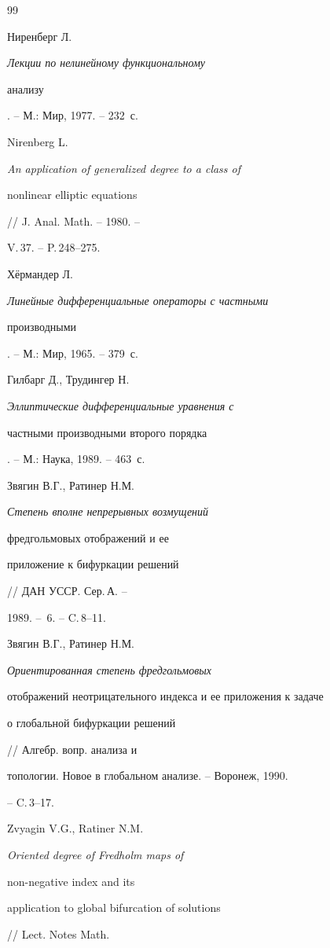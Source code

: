 \begin{thebibliography}{99}







Ниренберг Л. {\em Лекции по нелинейному функциональному 


анализу}. -- М.: Мир, 1977. -- 232~с.




Nirenberg L. {\em An application of generalized degree to a class of


nonlinear elliptic equations} // J. Anal. Math. -- 1980. --


V.\,37. -- P.\,248--275.




Х\"ермандер Л. {\em Линейные дифференциальные операторы с частными


производными}. -- М.: Мир, 1965. -- 379~с.




Гилбарг Д., Трудингер Н. {\em Эллиптические дифференциальные уравнения с


частными производными второго порядка}. -- М.: Наука, 1989. -- 463~с.




Звягин В.Г., Ратинер Н.М. {\em Степень вполне непрерывных возмущений


фредгольмовых отображений и ее


приложение к бифуркации решений} // ДАН УССР. Сер.\,А. --


1989. -- \No\,6. -- C.\,8--11.




Звягин В.Г., Ратинер Н.М. {\em Ориентированная степень фредгольмовых


отображений неотрицательного индекса и ее приложения к задаче


о глобальной бифуркации решений} // Алгебр. вопр. анализа и


топологии. Новое в глобальном анализе. -- Воронеж, 1990.


-- C.\,3--17.




Zvyagin V.G., Ratiner N.M. {\em Oriented degree of Fredholm maps of


non-negative index and its


application to global bifurcation of solutions} // Lect. Notes Math.



\end{thebibliography}
